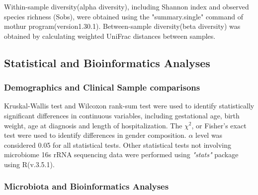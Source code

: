 \documentclass[fleqn,10pt]{wlpeerj} %
\begin{document}
   Within-sample diversity(alpha diversity), including Shannon index and observed species richness (Sobs), were obtained using the "summary.single" command of mothur program(version1.30.1)\citep{schloss2009introducing}. Between-sample diversity(beta diversity) was obtained by calculating weighted UniFrac distances between samples.

  \subsection*{Statistical and Bioinformatics Analyses}
    \subsubsection*{Demographics and Clinical Sample comparisons}
    Kruskal-Wallis test and Wilcoxon rank-sum test were used to identify statistically significant differences in continuous variables, including gestational age, birth weight, age at diagnosis and length of hospitalization. The $\chi^2$, or Fisher's exact test were used to identify differences in gender composition. $\alpha$ level was considered 0.05 for all statistical tests. Other statistical tests not involving microbiome 16s rRNA sequencing data were performed using \textit{"stats"} package using R(v.3.5.1).
    \subsubsection*{Microbiota and Bioinformatics Analyses}
\end{document}
